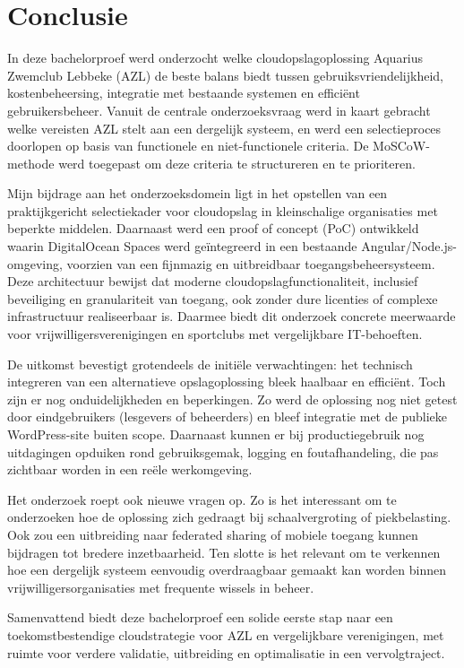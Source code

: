 
\chapter{Conclusie}%
\label{ch:conclusie}

In deze bachelorproef werd onderzocht welke cloudopslagoplossing Aquarius Zwemclub Lebbeke (AZL) de beste balans biedt tussen gebruiksvriendelijkheid, kostenbeheersing, integratie met bestaande systemen en efficiënt gebruikersbeheer. Vanuit de centrale onderzoeksvraag werd in kaart gebracht welke vereisten AZL stelt aan een dergelijk systeem, en werd een selectieproces doorlopen op basis van functionele en niet-functionele criteria. De MoSCoW-methode werd toegepast om deze criteria te structureren en te prioriteren.

Mijn bijdrage aan het onderzoeksdomein ligt in het opstellen van een praktijkgericht selectiekader voor cloudopslag in kleinschalige organisaties met beperkte middelen. Daarnaast werd een proof of concept (PoC) ontwikkeld waarin DigitalOcean Spaces werd geïntegreerd in een bestaande Angular/Node.js-omgeving, voorzien van een fijnmazig en uitbreidbaar toegangsbeheersysteem. Deze architectuur bewijst dat moderne cloudopslagfunctionaliteit, inclusief beveiliging en granulariteit van toegang, ook zonder dure licenties of complexe infrastructuur realiseerbaar is. Daarmee biedt dit onderzoek concrete meerwaarde voor vrijwilligersverenigingen en sportclubs met vergelijkbare IT-behoeften.

De uitkomst bevestigt grotendeels de initiële verwachtingen: het technisch integreren van een alternatieve opslagoplossing bleek haalbaar en efficiënt. Toch zijn er nog onduidelijkheden en beperkingen. Zo werd de oplossing nog niet getest door eindgebruikers (lesgevers of beheerders) en bleef integratie met de publieke WordPress-site buiten scope. Daarnaast kunnen er bij productiegebruik nog uitdagingen opduiken rond gebruiksgemak, logging en foutafhandeling, die pas zichtbaar worden in een reële werkomgeving.

Het onderzoek roept ook nieuwe vragen op. Zo is het interessant om te onderzoeken hoe de oplossing zich gedraagt bij schaalvergroting of piekbelasting. Ook zou een uitbreiding naar federated sharing of mobiele toegang kunnen bijdragen tot bredere inzetbaarheid. Ten slotte is het relevant om te verkennen hoe een dergelijk systeem eenvoudig overdraagbaar gemaakt kan worden binnen vrijwilligersorganisaties met frequente wissels in beheer.

Samenvattend biedt deze bachelorproef een solide eerste stap naar een toekomstbestendige cloudstrategie voor AZL en vergelijkbare verenigingen, met ruimte voor verdere validatie, uitbreiding en optimalisatie in een vervolgtraject.

